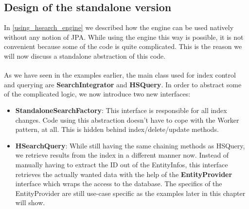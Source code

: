 \pagebreak

\subsection{Design of the standalone version} \label{standalone_hibernate_search}

In \ref{using_hsearch_engine} we described how the engine can be used natively without any notion of JPA. While using the engine this way is possible, it is not convenient because some of the code is quite complicated. This is the reason we will now discuss a standalone abstraction of this code.
\\\\
As we have seen in the examples earlier, the main class used for index control and querying are \textbf{SearchIntegrator} and \textbf{HSQuery}. In order to abstract some of the complicated logic, we now introduce two new interfaces: 

\begin{itemize}
	\item \textbf{StandaloneSearchFactory}: This interface is responsible for all index changes. Code using this abstraction doesn't have to cope with the Worker pattern, at all. This is hidden behind index/delete/update methods.
	
	\item \textbf{HSearchQuery}: While still having the same chaining methods as HSQuery, we retrieve results from the index in a different manner now. Instead of manually having to extract the ID out of the EntityInfos, this interface retrieves the actually wanted data with the help of the \textbf{EntityProvider} interface which wraps the access to the database. The specifics of the EntityProvider are still use-case specific as the examples later in this chapter will show.
\end{itemize}

\pagebreak

